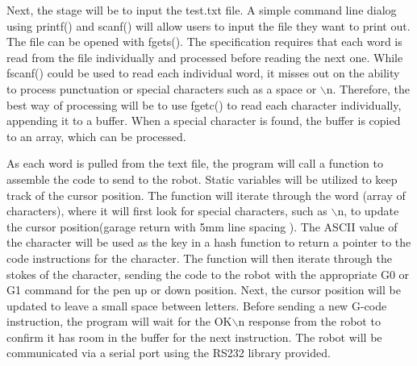 Next, the stage will be to input the test.txt file. A simple command line dialog using printf() and scanf() will allow users to input the file they want to print out. The file can be opened with fgets(). The specification requires that each word is read from the file individually and processed before reading the next one. While fscanf() could be used to read each individual word, it misses out on the ability to process punctuation or special characters such as a space or $\backslash$n. Therefore, the best way of processing will be to use fgetc() to read each character individually, appending it to a buffer. When a special character is found, the buffer is copied to an array, which can be processed. 

As each word is pulled from the text file, the program will call a function to assemble the code to send to the robot. Static variables will be utilized to keep track of the cursor position. The function will iterate through the word (array of characters), where it will first look for special characters, such as $\backslash$n, to update the cursor position(garage return with 5mm line spacing ). The ASCII value of the character will be used as the key in a hash function to return a pointer to the code instructions for the character. The function will then iterate through the stokes of the character, sending the code to the robot with the appropriate G0 or G1 command for the pen up or down position. Next, the cursor position will be updated to leave a small space between letters. Before sending a new G-code instruction, the program will wait for the OK$\backslash$n response from the robot to confirm it has room in the buffer for the next instruction. The robot will be communicated via a serial port using the RS232 library provided.
